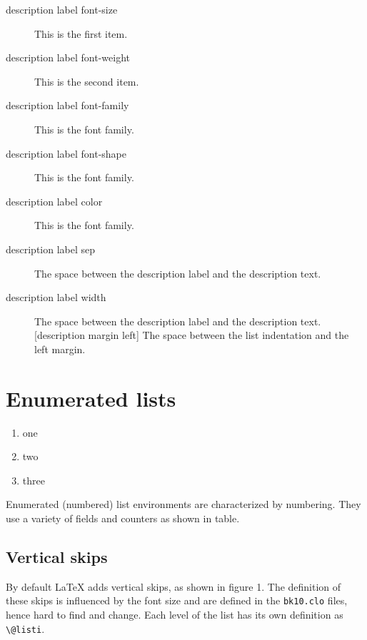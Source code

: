 \begin{description}
\item[description label font-size]This is the first item.
\item[description label font-weight]This is the second item. \lipsum*[1]
\item[description label font-family] This is the font family.
\item[description label font-shape] This is the font family.
\item[description label color] This is the font family.
\item[description label sep] The space between the description label and the description text.
\item [description label width] The space between the description label and the description text.
[description margin left] The space between the list indentation and the left margin.
\lipsum*[3]
\end{description}




\section{Enumerated lists}


\begin{enumerate}
\item one
\item two
\item three
\end{enumerate}

Enumerated (numbered) list environments are characterized by numbering. They use a variety of fields and counters as shown in table.

\subsection{Vertical skips}

By default LaTeX adds vertical skips, as shown in figure 1. The definition of these skips is influenced by the font size and are defined in the \texttt{bk10.clo} files, hence hard to find and change. Each level of the list has its own definition as \lstinline{\@listi}.

\bigskip
{}

